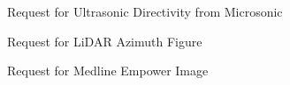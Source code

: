 
\begin{center}
\newline Request for Ultrasonic Directivity from Microsonic\\

\vspace{3\baselineskip} %

\newline Request for LiDAR Azimuth Figure\\

\vspace{3\baselineskip} %

\newline Request for Medline Empower Image\\


\end{center}
